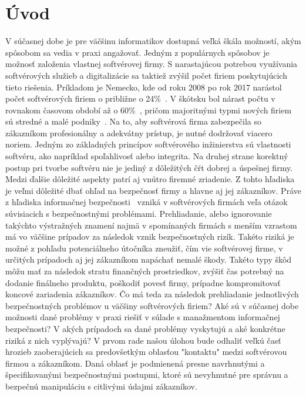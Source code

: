 \chapter{Úvod}\label{ch:úvod}

V súčasnej dobe je pre väčšinu informatikov dostupná veľká škála možností, akým spôsobom sa vedia v praxi angažovať.
Jedným z populárnych spôsobov je možnosť založenia vlastnej softvérovej firmy.
S narastajúcou potrebou využívania softvérových služieb a digitalizácie sa taktiež zvýšil počet firiem poskytujúcich tieto riešenia.
Príkladom je Nemecko, kde od roku 2008 po rok 2017 narástol počet softvérových firiem o približne o 24\%~\cite{CompaniesGerman}.
V škótsku bol nárast počtu v rovnakom časovom období až o 60\%~\cite{SoftwareBusiness}, pričom majoritnými typmi nových
firiem sú stredné a malé podniky~\cite{CompaniesScotch}.
Na to, aby softvérová firma zabezpečila so zákazníkom profesionálny a adekvátny prístup, je nutné dodržovať viacero noriem.
Jedným zo základných princípov softvérového inžinierstva sú vlastnosti softvéru, ako napríklad spoľahlivosť alebo integrita.
Na druhej strane korektný postup pri tvorbe softvéru nie je jediný z dôležitých čŕt dobrej a úspešnej firmy.
Medzi ďalšie dôležité aspekty patrí aj vnútro firemné zriadenie.
Z tohto hľadiska je veľmi dôležité dbať ohľad na bezpečnosť firmy a hlavne aj jej zákazníkov.
Práve z hľadiska informačnej bezpečnosti~\cite{IB} vzniká v softvérových firmách veľa otázok súvisiacich s bezpečnostnými problémami.
Prehliadanie, alebo ignorovanie takýchto výstražných znamení najmä v spomínaných firmách s menším vzrastom má vo väčšine
prípadov za následok vznik bezpečnostných rizík.
Takéto riziká je možné z pohľadu potenciálneho útočníka zneužiť, čím vie softvérovej firme, v určitých prípadoch aj jej
zákazníkom napáchať nemalé škody.
Takéto typy škôd môžu mať za následok stratu finančných prostriedkov, zvýšiť čas potrebný na dodanie finálneho
produktu, poškodiť povesť firmy, prípadne kompromitovať koncové zariadenia zákazníkov.
Čo má teda za následok prehliadanie jednotlivých bezpečnostných problémov u väčšiny softvérových firiem?
Aké sú v súčasnej dobe možnosti dané problémy v praxi riešiť v súlade s manažmentom informačnej bezpečnosti?
V akých prípadoch sa dané problémy vyskytujú a aké konkrétne riziká z nich vyplývajú?
V prvom rade našou úlohou bude odhaliť veľkú časť hrozieb zaoberajúcich sa predovšetkým oblasťou "kontaktu" medzi softvérovou firmou a zákazníkom.
Daná oblasť je podmienená presne navrhnutými a špecifikovanými bezpečnostnými
postupmi, ktoré sú nevyhnutné pre správnu a bezpečnú manipuláciu s citlivými údajmi zákazníkov.
